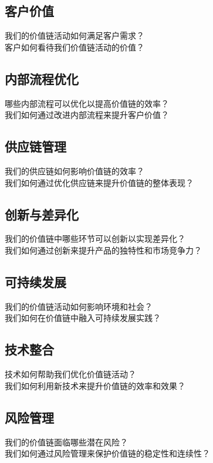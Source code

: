 \documentclass[12pt]{book}
\begin{document}
\subsection{客户价值}
我们的价值链活动如何满足客户需求？\\
客户如何看待我们价值链活动的价值？\\

\subsection{内部流程优化}
哪些内部流程可以优化以提高价值链的效率？\\
我们如何通过改进内部流程来提升客户价值？\\

\subsection{供应链管理}
我们的供应链如何影响价值链的效率？\\
我们如何通过优化供应链来提升价值链的整体表现？\\

\subsection{创新与差异化}
我们的价值链中哪些环节可以创新以实现差异化？\\
我们如何通过创新来提升产品的独特性和市场竞争力？\\

\subsection{可持续发展}
我们的价值链活动如何影响环境和社会？\\
我们如何在价值链中融入可持续发展实践？\\

\subsection{技术整合}
技术如何帮助我们优化价值链活动？\\
我们如何利用新技术来提升价值链的效率和效果？\\

\subsection{风险管理}
我们的价值链面临哪些潜在风险？\\
我们如何通过风险管理来保护价值链的稳定性和连续性？\\
\end{document}
